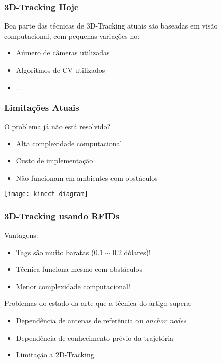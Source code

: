 \begin{frame}
  \frametitle{3D-Tracking Hoje}

  Boa parte das técnicas de 3D-Tracking atuais são baseadas em visão
  computacional, com pequenas variações no:

  \begin{itemize}
    \item Aúmero de câmeras utilizadas
    \item Algoritmos de CV utilizados
    \item $\dots$
  \end{itemize}
\end{frame}

\begin{frame}
    \frametitle{Limitações Atuais}

    O problema já não está resolvido?

    \begin{itemize}
    \item  Alta complexidade computacional
    \item  Custo de implementação
    \item  Não funcionam em ambientes com obstáculos
    \end{itemize}

    \begin{center}
        \texttt{[image: kinect-diagram]}
    \end{center}
\end{frame}


\begin{frame}
    \frametitle{3D-Tracking usando RFIDs}

    Vantagens:
    \begin{itemize}
    \item  \alert{Tags são muito baratas} ($0.1 \sim 0.2$ dólares)!
    \item  Técnica \alert{funciona mesmo com obstáculos}
    \item  \alert{Menor complexidade computacional}!
    \end{itemize}

    Problemas do estado-da-arte que a técnica do artigo supera:
    \begin{itemize}
    \item  Dependência de antenas de referência ou \emph{anchor nodes}
    \item  Dependência de conhecimento prévio da trajetória
    \item  Limitação a 2D-Tracking
    \end{itemize}
\end{frame}
